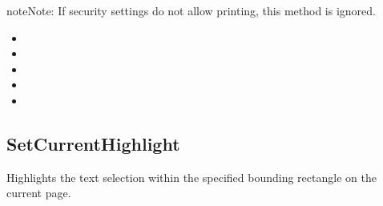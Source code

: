 \documentclass[letterpaper,12pt,english,openany,oneside]{sphinxmanual}
\begin{document}
\begin{sphinxadmonition}{note}{Note:}
If security settings do not allow printing, this method is ignored.
\end{sphinxadmonition}


\begin{sphinxVerbatim}[commandchars=\\\{\}]
 
\end{sphinxVerbatim}
\label{\detokenize{IAC_API_OLE_Objects:related-methods-145}}
\begin{itemize}
\item {} 
 

\item {} 
 

\item {} 
 

\item {} 
 

\item {} 
 

\end{itemize}




\subsection{SetCurrentHighlight}
\label{\detokenize{IAC_API_OLE_Objects:setcurrenthighlight}}
Highlights the text selection within the specified bounding rectangle on the current page.


\begin{sphinxVerbatim}[commandchars=\\\{\}]
    
                    
\end{sphinxVerbatim}
\label{\detokenize{IAC_API_OLE_Objects:parameters-84}}
\end{document}
